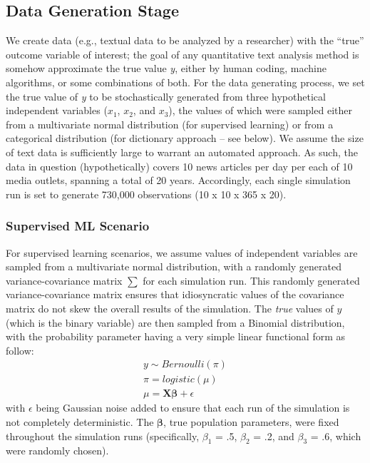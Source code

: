 \documentclass[man, 12pt, a4paper, nolmodern, noextraspace]{apa6}
\begin{document}
    \subsection{Data Generation Stage}
    
    We create data (e.g., textual data to be analyzed by a researcher) with the \enquote{true} outcome variable of interest; the goal of any quantitative text analysis method is somehow approximate the true value \textit{y}, either by human coding, machine algorithms, or some combinations of both. For the data generating process, we set the true value of \textit{y} to be stochastically generated from three hypothetical independent variables ($x_1$, $x_2$, and $x_3$), the values of which were sampled either from a multivariate normal distribution (for supervised learning) or from a categorical distribution (for dictionary approach -- see below). We assume the size of text data is sufficiently large to warrant an automated approach. As such, the data in question (hypothetically) covers 10 news articles per day per each of 10 media outlets, spanning a total of 20 years. Accordingly, each single simulation run is set to generate 730,000 observations (10 x 10 x 365 x 20).
    
    \subsubsection{Supervised ML Scenario}
    For supervised learning scenarios, we assume values of independent variables are sampled from a multivariate normal distribution, with a randomly generated variance-covariance matrix \textbf{$\sum$} for each simulation run. This randomly generated variance-covariance matrix ensures that idiosyncratic values of the covariance matrix do not skew the overall results of the simulation. The \textit{true}  values of $y$ (which is the binary variable) are then sampled from a Binomial distribution, with the probability parameter having a very simple linear functional form as follow:
    \begin{equation}
        \begin{gathered}
            y \sim Bernoulli(\pi) \\
            \pi = logistic(\mu) \\
            \mu = \boldsymbol{X\beta} + \epsilon
        \end{gathered}
    \end{equation}
    \noindent with $\epsilon$ being Gaussian noise added to ensure that each run of the simulation is not completely deterministic. The $\boldsymbol{\beta}$, true population parameters, were fixed throughout the simulation runs (specifically, $\beta_1$ = .5, $\beta_2$ = .2, and $\beta_3$ = .6, which were randomly chosen). 
    
\end{document}
